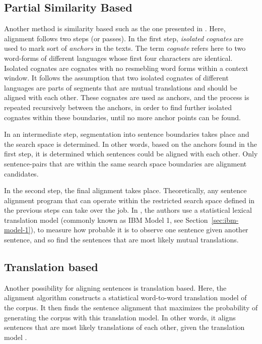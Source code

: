 \subsection{Partial Similarity Based}
Another method is similarity based such as the one presented in \cite{simard-plamondon-1996-bilingual}. 
Here, alignment follows two steps (or passes). 
In the first step, \emph{isolated cognates} are used to mark sort of \emph{anchors} in the texts. 
The term \emph{cognate} refers here to two word-forms of different languages whose  first four characters are identical. 
Isolated cognates are cognates with no resmebling word forms within a context window.
It follows the assumption that two isolated cognates of different languages are parts of segments that are mutual translations and should be aligned with each other. 
These cognates are used as anchors, and the process is repeated recursively between the anchors, in order to find further isolated cognates within these boundaries, until no more anchor points can be found.

In an intermediate step, segmentation into sentence boundaries takes place and the search space is determined. 
In other words, based on the anchors found in the first step, it is determined which sentences could be aligned with each other. 
Only sentence-pairs that are within the same search space boundaries are alignment candidates.

In the second step, the final alignment takes place. 
Theoretically, any sentence alignment program that can operate within the restricted search space defined in the previous steps can take over the job. 
In \cite{simard-plamondon-1996-bilingual}, the authors use a statistical lexical translation model (commonly known as IBM Model 1, see Section~\ref{sec:ibm-model-1}), to measure how probable it is to observe one sentence given another sentence, and so find the sentences that are most likely mutual translations.

\subsection{Translation based}

Another possibility for aligning sentences is translation based. 
Here, the alignment algorithm constructs a statistical word-to-word translation model of the corpus. 
It then finds the sentence alignment that maximizes the probability of generating the corpus with this translation model. 
In other words, it aligns sentences that are most likely translations of each other, given the translation model \autocite{chen-1993-aligning}. 

